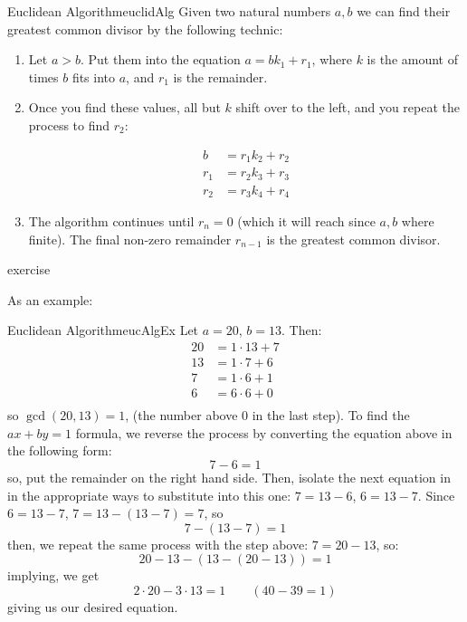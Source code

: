 \documentclass{book}
\begin{document}
\begin{thm}{Euclidean Algorithm}{euclidAlg}
	Given two natural numbers $a,b$ we can find their greatest common divisor by the following technic:
	\begin{enumerate}
		\item Let $a > b$. Put them into the equation $a = bk_1 + r_1$, where $k$ is the amount of times $b$ fits into $a$,
			and $r_1$ is the remainder.
		\item Once you find these values, all but $k$ shift over to the left, and you repeat the process to find $r_2$:
			\begin{center}
				\begin{align*}
					b &= r_1k_2 + r_2\\
					r_1 &= r_2k_3 + r_3\\
					r_2 &= r_3k_4 + r_4
				\end{align*}
			\end{center}
		\item The algorithm continues until $r_n = 0$ (which it will reach since $a,b$ where finite). The final non-zero
			remainder $r_{n-1}$ is the greatest common divisor.
	\end{enumerate}
\end{thm}

\begin{Proof}
	exercise
\end{Proof}

As an example:

\begin{example}{Euclidean Algorithm}{eucAlgEx}
	Let $a = 20$, $b = 13$. Then:
	\begin{align*}
		20 &= 1\cdot 13 + 7\\
		13 &= 1\cdot 7 + 6\\
		7 &= 1\cdot 6 + 1\\
		6 &= 6\cdot 6 + 0\\
	\end{align*}
	so $\gcd(20,13) = 1$, (the number above $0$ in the last step). To find the $ax + by = 1$ formula, we reverse the
	process by converting the equation above in the following form:
	\[
		7 - 6 = 1
	\]
	so, put the remainder on the right hand side. Then, isolate the next equation in in the appropriate ways to
	substitute into this one: $7 = 13-6$, $6 = 13-7$. Since $6 =13-7$, $7 = 13-(13-7) = 7$, so
	\[
		7 - (13-7) = 1
	\]
	then, we repeat the same process with the step above: $7 = 20-13$, so:
	\[
		20-13-(13-(20-13)) = 1
	\]
	implying, we get
	\[
		2\cdot 20 - 3\cdot 13 =1  \qquad (40-39 =1)
	\]
	giving us our desired equation.
\end{example}
\end{document}
